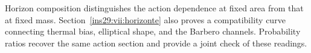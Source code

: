 Horizon composition distinguishes the action dependence at fixed area
from that at fixed mass. Section~\ref{ins29:vii:horizonte} also proves
a compatibility curve connecting thermal bias, elliptical shape, and
the Barbero channels. Probability ratios recover the same action section
and provide a joint check of these readings.

